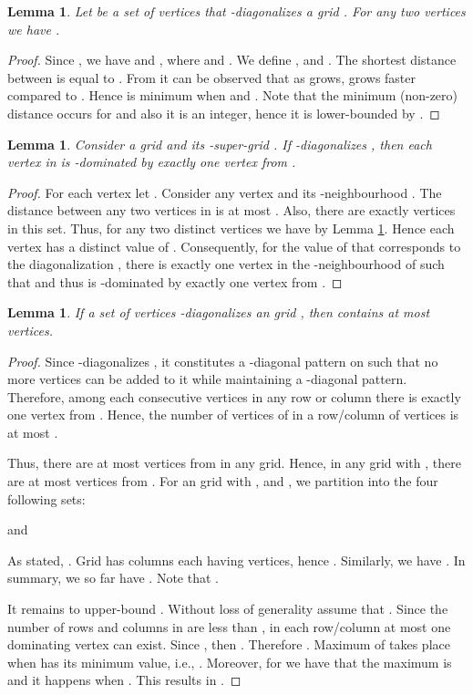 \documentclass[letterpaper, 10pt, conference]{ieeeconf}
\newtheorem{lemma}[theorem]{Lemma}
\theoremstyle{definition}
\theoremstyle{remark}
\begin{document}
\begin{lemma}
\label{lem:k-min-2k+1}
Let  be a set of vertices that -diagonalizes a grid . For any two vertices  we have .
\end{lemma}

\begin{proof}
Since , we have  and , where  and . We define ,  and . The shortest distance between  is equal to . From  it can be observed that as  grows,  grows faster compared to . Hence  is minimum when  and . Note that the minimum (non-zero) distance occurs for  and also it is an integer, hence it is lower-bounded by .
\end{proof}


\begin{lemma}
\label{lem:k-distane-k-super}
Consider a grid  and its -super-grid . If  -diagonalizes , then each vertex in  is -dominated by exactly one vertex from .
\end{lemma}

\begin{proof}
For each vertex  let . Consider any vertex  and its -neighbourhood . The distance between any two vertices in  is at most . Also, there are exactly  vertices in this set. Thus, for any two distinct vertices  we have  by Lemma \ref{lem:k-min-2k+1}. Hence each vertex  has a distinct value of . Consequently, for the value of  that corresponds to the diagonalization , there is exactly one vertex in the -neighbourhood of  such that  and thus  is -dominated by exactly one vertex from .
\end{proof}

\begin{lemma}
\label{lem:k-diag-cardinal}
If a set of vertices  -diagonalizes an  grid , then  contains at most 
vertices.
\end{lemma}

\begin{proof}
Since  -diagonalizes , it constitutes a -diagonal pattern on  such that no more vertices can be added to it while maintaining a -diagonal pattern. Therefore, among each  consecutive vertices in any row or column there is exactly one vertex from . Hence, the number of vertices of  in a row/column of  vertices is at most .

Thus, there are at most  vertices from  in any  grid. Hence, in any  grid with , there are at most  vertices from . For an  grid  with ,  and , we partition  into the four following sets: 


 
and
 
As stated, . Grid  has  columns each having  vertices, hence . Similarly, we have . In summary, we so far have . Note that .

It remains to upper-bound . Without loss of generality assume that . Since the number of rows and columns in  are less than , in each row/column at most one dominating vertex can exist. Since , then . Therefore . Maximum of  takes place when  has its minimum value, i.e., . Moreover, for  we have that the maximum is  and it happens when . This results in .

\end{proof}
\end{document}
